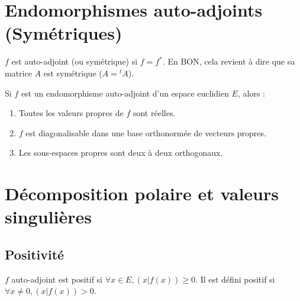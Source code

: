 \documentclass[french]{yLectureNote}
\begin{document}
\section{Endomorphismes auto-adjoints (Symétriques)}

\begin{definition}
    $f$ est auto-adjoint (ou symétrique) si $f = f^*$. En BON, cela revient à dire que sa matrice $A$ est symétrique ($A = {}^tA$).
\end{definition}

\begin{theorem}
    Si $f$ est un endomorphisme auto-adjoint d'un espace euclidien $E$, alors :
    \begin{enumerate}
        \item Toutes les valeurs propres de $f$ sont réelles.
        \item $f$ est diagonalisable dans une base orthonormée de vecteurs propres.
        \item Les sous-espaces propres sont deux à deux orthogonaux.
    \end{enumerate}
\end{theorem}


\section{Décomposition polaire et valeurs singulières}

\subsection{Positivité}
\begin{definition}[Positivité]
    $f$ auto-adjoint est positif si $\forall x \in E, (x|f(x)) \ge 0$.
    Il est défini positif si $\forall x \neq 0, (x|f(x)) > 0$.
\end{definition}
\end{document}
